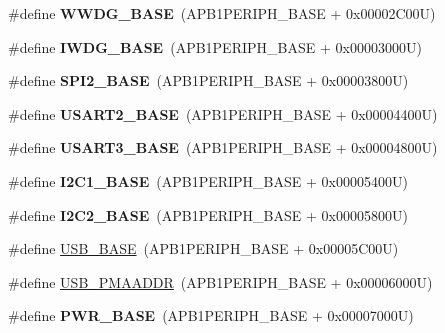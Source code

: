 \begin{DoxyCompactItemize}
\item 
\hypertarget{group___peripheral__memory__map_ga9a5bf4728ab93dea5b569f5b972cbe62}{\#define {\bfseries W\-W\-D\-G\-\_\-\-B\-A\-S\-E}~(A\-P\-B1\-P\-E\-R\-I\-P\-H\-\_\-\-B\-A\-S\-E + 0x00002\-C00\-U)}\label{group___peripheral__memory__map_ga9a5bf4728ab93dea5b569f5b972cbe62}

\item 
\hypertarget{group___peripheral__memory__map_ga8543ee4997296af5536b007cd4748f55}{\#define {\bfseries I\-W\-D\-G\-\_\-\-B\-A\-S\-E}~(A\-P\-B1\-P\-E\-R\-I\-P\-H\-\_\-\-B\-A\-S\-E + 0x00003000\-U)}\label{group___peripheral__memory__map_ga8543ee4997296af5536b007cd4748f55}

\item 
\hypertarget{group___peripheral__memory__map_gac3e357b4c25106ed375fb1affab6bb86}{\#define {\bfseries S\-P\-I2\-\_\-\-B\-A\-S\-E}~(A\-P\-B1\-P\-E\-R\-I\-P\-H\-\_\-\-B\-A\-S\-E + 0x00003800\-U)}\label{group___peripheral__memory__map_gac3e357b4c25106ed375fb1affab6bb86}

\item 
\hypertarget{group___peripheral__memory__map_gade83162a04bca0b15b39018a8e8ec090}{\#define {\bfseries U\-S\-A\-R\-T2\-\_\-\-B\-A\-S\-E}~(A\-P\-B1\-P\-E\-R\-I\-P\-H\-\_\-\-B\-A\-S\-E + 0x00004400\-U)}\label{group___peripheral__memory__map_gade83162a04bca0b15b39018a8e8ec090}

\item 
\hypertarget{group___peripheral__memory__map_gabe0d6539ac0026d598274ee7f45b0251}{\#define {\bfseries U\-S\-A\-R\-T3\-\_\-\-B\-A\-S\-E}~(A\-P\-B1\-P\-E\-R\-I\-P\-H\-\_\-\-B\-A\-S\-E + 0x00004800\-U)}\label{group___peripheral__memory__map_gabe0d6539ac0026d598274ee7f45b0251}

\item 
\hypertarget{group___peripheral__memory__map_gacd72dbffb1738ca87c838545c4eb85a3}{\#define {\bfseries I2\-C1\-\_\-\-B\-A\-S\-E}~(A\-P\-B1\-P\-E\-R\-I\-P\-H\-\_\-\-B\-A\-S\-E + 0x00005400\-U)}\label{group___peripheral__memory__map_gacd72dbffb1738ca87c838545c4eb85a3}

\item 
\hypertarget{group___peripheral__memory__map_ga04bda70f25c795fb79f163b633ad4a5d}{\#define {\bfseries I2\-C2\-\_\-\-B\-A\-S\-E}~(A\-P\-B1\-P\-E\-R\-I\-P\-H\-\_\-\-B\-A\-S\-E + 0x00005800\-U)}\label{group___peripheral__memory__map_ga04bda70f25c795fb79f163b633ad4a5d}

\item 
\#define \hyperlink{group___peripheral__memory__map_gaa6c4cbed4ddbb3ecd77de93fab2a2e04}{U\-S\-B\-\_\-\-B\-A\-S\-E}~(A\-P\-B1\-P\-E\-R\-I\-P\-H\-\_\-\-B\-A\-S\-E + 0x00005\-C00\-U)
\item 
\#define \hyperlink{group___peripheral__memory__map_gaf992dfdd5707568c5cb5506e2347e808}{U\-S\-B\-\_\-\-P\-M\-A\-A\-D\-D\-R}~(A\-P\-B1\-P\-E\-R\-I\-P\-H\-\_\-\-B\-A\-S\-E + 0x00006000\-U)
\item 
\hypertarget{group___peripheral__memory__map_gac691ec23dace8b7a649a25acb110217a}{\#define {\bfseries P\-W\-R\-\_\-\-B\-A\-S\-E}~(A\-P\-B1\-P\-E\-R\-I\-P\-H\-\_\-\-B\-A\-S\-E + 0x00007000\-U)}\label{group___peripheral__memory__map_gac691ec23dace8b7a649a25acb110217a}


\end{DoxyCompactItemize}
